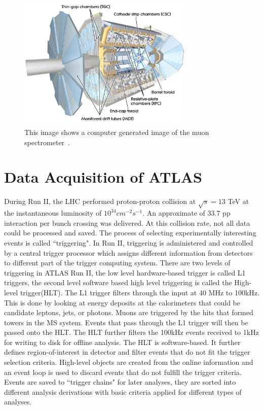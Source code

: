 \begin{figure}[!htb]
    \begin{center}
        \includegraphics[width=0.75\textwidth]{figures/chapter_ATLAS/MuonSpectrometer}
        \caption{
            This image shows a computer generated image of the muon spectrometer~\cite{Pequenao:1095929}.
        }
        \label{fig:MuonSpectrometer}
    \end{center}
\end{figure}

\section{Data Acquisition of ATLAS}
\label{trigger}
During Run II, the LHC performed proton-proton collision at $\sqrt{s}=13$ TeV at the instantaneous luminosity of $10^{34}cm^{-2}s^{-1}$. An approximate of 33.7 pp interaction per bunch crossing was delivered. 
At this collision rate, not all data could be processed and saved. The process of selecting experimentally interesting events is called ``triggering". In Run II, triggering is administered and controlled by a central trigger processor which assigns different information from detectors to different part of the trigger computing system. There are two levels of triggering in ATLAS Run II, the low level hardware-based trigger is called L1 triggers, the second level software based high level triggering is called the High-level trigger(HLT). 
The L1 trigger filters through the input at 40 MHz to 100kHz. This is done by looking at energy deposits at the calorimeters that could be
candidate leptons, jets, or photons. Muons are triggered by the hits that formed towers in the MS system. 
Events that pass through the L1 trigger will then be passed onto the HLT. The HLT further filters the 100kHz events received to 1kHz for writing to disk for offline analysis. The HLT is software-based. It further defines region-of-interest in detector and filter events that do not fit the trigger selection criteria. High-level objects are created from
the online information and an event loop is used to discard events that do not fulfill the trigger criteria.
Events are saved to ``trigger chains" for later analyses, they are sorted into different analysis derivations with basic criteria applied for different types of analyses. 

